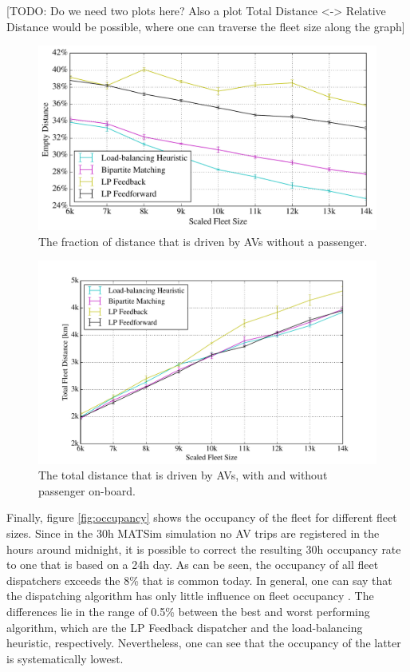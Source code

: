 [TODO: Do we need two plots here? Also a plot Total Distance <-> Relative Distance
would be possible, where one can traverse the fleet size along the graph]

\begin{figure}
\includegraphics[width=1.0\textwidth]{figures/empty_rides.pdf}
\caption{The fraction of distance that is driven by AVs without a passenger.}
\label{fig:empty_rides}
\end{figure}

\begin{figure}
\includegraphics[width=1.0\textwidth]{figures/total_distance.pdf}
\caption{The total distance that is driven by AVs, with and without passenger on-board.}
\label{fig:total_distance}
\end{figure}

Finally, figure \ref{fig:occupancy} shows the occupancy of the fleet for different fleet sizes. Since in the 30h MATSim simulation no AV trips are registered in the hours around midnight, it is possible to correct the resulting 30h occupancy rate to one that is based on a 24h day. As can be seen, the occupancy of all fleet dispatchers exceeds the 8\% that is common today. In general, one can say
that the dispatching algorithm has only little influence on fleet occupancy . The differences lie in the range of 0.5\% between the best and worst performing algorithm, which are the LP Feedback dispatcher and the load-balancing heuristic, respectively.
Nevertheless, one can see that the occupancy of the latter is systematically lowest.

